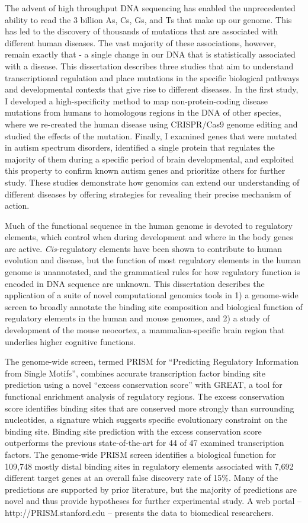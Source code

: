 The advent of high throughput DNA sequencing has enabled the unprecedented 
ability to read the 3 billion As, Cs, Gs, and Ts that make up our genome. 
This has led to the discovery of thousands of mutations that are 
associated with different human diseases. The vast majority of these 
associations, however, remain exactly that - a single change in our DNA 
that is statistically associated with a disease. This dissertation 
describes three studies that aim to understand transcriptional 
regulation and place mutations in the specific  biological pathways and 
developmental contexts that give rise to different  diseases. In the first 
study, I developed a high-specificity method to map non-protein-coding disease mutations from humans to homologous regions in the DNA of other species, where we re-created the human disease using CRISPR/Cas9 genome editing and studied the effects of the mutation. Finally, I examined genes that were mutated in autism spectrum disorders, identified a single protein that regulates the majority of them during a specific period of brain developmental, and exploited this property to confirm known autism genes and prioritize others for further study. These studies demonstrate how genomics can extend our understanding of different diseases by offering strategies for revealing their precise mechanism of action.


Much of the functional sequence in the human genome is devoted to
regulatory elements, which control when during development and where in
the body genes are active.  \textit{Cis}-regulatory elements have been shown to
contribute to human evolution and disease, but the function of most regulatory elements in
the human genome is unannotated, and the grammatical rules for how regulatory
function is encoded in DNA sequence are unknown.  This dissertation
describes the application of a suite of novel computational genomics tools
in 1) a genome-wide screen to broadly annotate the
binding site composition and biological function of regulatory elements in the human and
mouse genomes, and 2) a study of development of the mouse
neocortex, a mammalian-specific brain region that underlies higher cognitive functions.
%

The genome-wide screen, termed PRISM for ``Predicting Regulatory Information
from Single Motifs'', combines accurate transcription factor
binding site prediction using a novel ``excess conservation score'' with
GREAT, a tool for functional enrichment analysis of regulatory regions.  The
excess conservation score identifies binding sites that are conserved more
strongly than surrounding nucleotides, a signature which suggests specific
evolutionary constraint on the binding site.  Binding site prediction with
the excess conservation score outperforms the previous state-of-the-art for
44 of 47 examined transcription factors.  The genome-wide PRISM screen identifies a biological function
for 109,748 mostly distal binding sites in regulatory elements associated with 7,692
different target genes at an overall false discovery rate of 15\%.  Many of
the predictions are supported by prior literature, but the majority of predictions
are novel and thus provide hypotheses for further experimental study.  A web
portal -- http://PRISM.stanford.edu -- presents the data to biomedical researchers.
%

